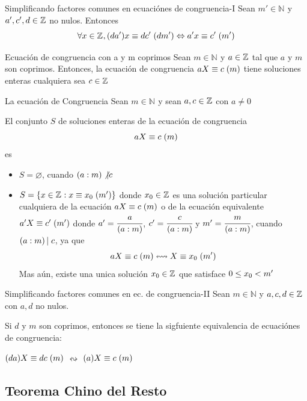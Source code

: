 \documentclass[10pt]{article}
\newcommand{\nat}[1]{\mathbb{N}^{#1}}
\begin{document}
\begin{obs}{Simplificando factores comunes en ecuaciónes de congruencia-I}
 Sean $m' \in \nat{}$ y $a',c',d \in \mathbb{Z}^{}$ no nulos. Entonces
 \[\forall x \in \mathbb{Z}^{}, (d a')x \equiv d c' \hspace{0.1cm} (d m') \Leftrightarrow a' x \equiv c' \hspace{0.1cm} (m')\]
\end{obs}

\begin{cor}{Ecuación de congruencia con a y m coprimos}
 Sean $m \in \nat{}$ y $a \in \mathbb{Z}^{}$ tal que $a$ y $m$ son coprimos. Entonces, la ecuación de congruencia $aX \equiv c \hspace{0.1cm} (m)$ tiene soluciones enteras cualquiera sea $c \in \mathbb{Z}^{}$
\end{cor}

\begin{teo}{La ecuación de Congruencia}
 Sean $m \in \nat{}$ y sean $a, c \in \mathbb{Z}^{}$ con $a \neq 0$

 El conjunto $S$ de soluciones enteras de la ecuación de congruencia
 \[aX \equiv c \hspace{0.1cm} (m)\]
 es\begin{itemize}
    \item $S = \varnothing$, cuando $(a:m) \not\vert c$
    \item $S = \{x \in \mathbb{Z}^{}: x \equiv x_0 \hspace{0.1cm} (m')\}$ donde $x_0 \in \mathbb{Z}^{}$ es una solución particular cualquiera de la ecuación $aX \equiv c \hspace{0.1cm} (m)$ o de la ecuación equivalente $a' X \equiv c' \hspace{0.1cm} (m')$ donde $a' = \cfrac{a}{(a:m)}$, $c' = \cfrac{c}{(a:m)}$ y $m' = \cfrac{m}{(a:m)}$, cuando $(a:m)\left\vert\right.c$, ya que 
    \[a X \equiv c \hspace{0.1cm} (m) \leftrightsquigarrow X \equiv x_0 \hspace{0.1cm} (m')\]
    Mas aún, existe una unica solución $x_0 \in \mathbb{Z}^{}$ que satisface $0 \leq x_0 < m'$
    \end{itemize}
 \end{teo}

\begin{obs}{Simplificando factores comunes en ec. de congruencia-II}
 Sean $m \in \mathbb{N}$ y $a,c,d \in \mathbb{Z}^{}$ con $a,d$ no nulos.
 
 Si $d$ y $m$ son coprimos, entonces se tiene la sigfuiente equivalencia de ecuaciónes de congruencia:
 \begin{center}
  $(d a)X \equiv d c \hspace{0.1cm} (m)$ $\leftrightsquigarrow$ $(a)X \equiv c \hspace{0.1cm} (m)$
 \end{center}

\end{obs}

\begin{center}
\subsection{Teorema Chino del Resto} 
\end{center}
\end{document}
